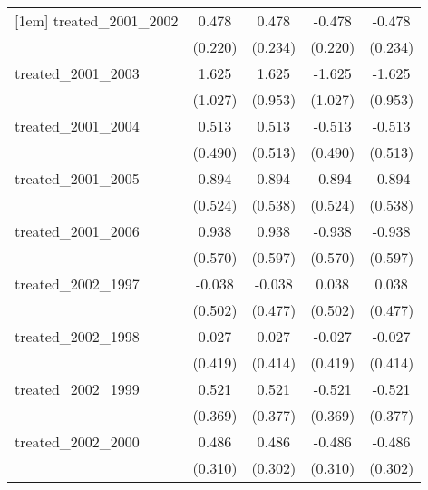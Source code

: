 {\begin{tabular}{l*{4}{c}}
[1em]
treated\_2001\_2002&       0.478\sym{*}  &       0.478\sym{*}  &      -0.478\sym{*}  &      -0.478\sym{*}  \\
            &     (0.220)         &     (0.234)         &     (0.220)         &     (0.234)         \\
[1em]
treated\_2001\_2003&       1.625         &       1.625         &      -1.625         &      -1.625         \\
            &     (1.027)         &     (0.953)         &     (1.027)         &     (0.953)         \\
[1em]
treated\_2001\_2004&       0.513         &       0.513         &      -0.513         &      -0.513         \\
            &     (0.490)         &     (0.513)         &     (0.490)         &     (0.513)         \\
[1em]
treated\_2001\_2005&       0.894         &       0.894         &      -0.894         &      -0.894         \\
            &     (0.524)         &     (0.538)         &     (0.524)         &     (0.538)         \\
[1em]
treated\_2001\_2006&       0.938         &       0.938         &      -0.938         &      -0.938         \\
            &     (0.570)         &     (0.597)         &     (0.570)         &     (0.597)         \\
[1em]
treated\_2002\_1997&      -0.038         &      -0.038         &       0.038         &       0.038         \\
            &     (0.502)         &     (0.477)         &     (0.502)         &     (0.477)         \\
[1em]
treated\_2002\_1998&       0.027         &       0.027         &      -0.027         &      -0.027         \\
            &     (0.419)         &     (0.414)         &     (0.419)         &     (0.414)         \\
[1em]
treated\_2002\_1999&       0.521         &       0.521         &      -0.521         &      -0.521         \\
            &     (0.369)         &     (0.377)         &     (0.369)         &     (0.377)         \\
[1em]
treated\_2002\_2000&       0.486         &       0.486         &      -0.486         &      -0.486         \\
            &     (0.310)         &     (0.302)         &     (0.310)         &     (0.302)         \\

\end{tabular}}
